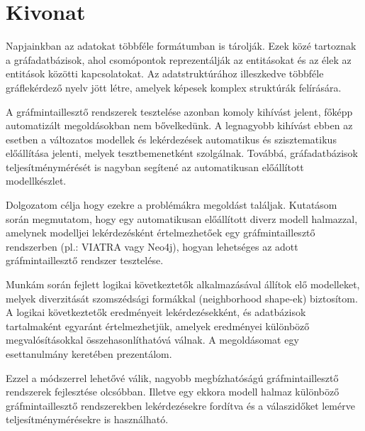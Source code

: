 \setcounter{page}{1}

\selecthungarian

\chapter*{Kivonat}

Napjainkban az adatokat többféle formátumban is tárolják. Ezek közé tartoznak a gráfadatbázisok, ahol  csomópontok reprezentálják az entitásokat és az élek az entitások közötti kapcsolatokat. Az adatstruktúrához illeszkedve többféle gráflekérdező nyelv jött létre, amelyek képesek komplex struktúrák felírására.

A gráfmintaillesztő rendszerek tesztelése azonban komoly kihívást jelent, főképp automatizált megoldásokban nem bővelkedünk. A legnagyobb kihívást ebben az esetben a változatos modellek és lekérdezések automatikus és szisztematikus előállítása jelenti, melyek tesztbemenetként szolgálnak. Továbbá, gráfadatbázisok teljesítménymérését is nagyban segítené  az automatikusan előállított modellkészlet.

Dolgozatom célja hogy ezekre a problémákra megoldást találjak. Kutatásom során   megmutatom, hogy egy automatikusan előállított diverz modell halmazzal, amelynek modelljei lekérdezésként értelmezhetőek egy gráfmintaillesztő rendszerben (pl.: VIATRA vagy Neo4j), hogyan lehetséges  az adott gráfmintaillesztő rendszer tesztelése.

Munkám során fejlett logikai következtetők alkalmazásával állítok elő modelleket, melyek diverzitását szomszédsági formákkal (neighborhood shape-ek) biztosítom. A logikai következtetők eredményeit lekérdezésekként, és adatbázisok tartalmaként egyaránt értelmezhetjük, amelyek eredményei különböző megvalósításokkal összehasonlíthatóvá válnak. A megoldásomat egy esettanulmány keretében prezentálom.

Ezzel a módszerrel lehetővé válik, nagyobb megbízhatóságú gráfmintaillesztő rendszerek fejlesztése olcsóbban. Illetve egy ekkora modell halmaz különböző gráfmintaillesztő rendszerekben lekérdezésekre fordítva és a válaszidőket lemérve teljesítménymérésekre is használható.



\vfill
\selectenglish


